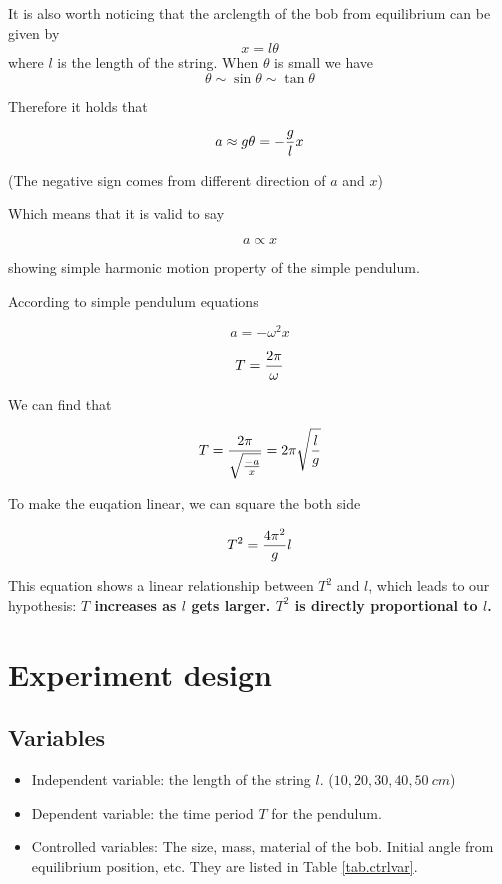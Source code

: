 \documentclass[a4paper]{article}
\begin{document}
It is also worth noticing that the arclength of the bob from equilibrium can be given by $$x = l\theta$$ where $l$ is the length of the string. When $\theta$ is small we have $$\theta \sim \sin \theta \sim \tan \theta$$

Therefore it holds that

$$a \approx g\theta = -{g\over l} x $$

(The negative sign comes from different direction of $a$ and $x$)

Which means that it is valid to say

$$a \propto x$$

showing simple harmonic motion property of the simple pendulum.

According to simple pendulum equations 

$$a = -\omega^2 x$$

$$T = {2\pi \over \omega}$$

We can find that 

$$T = {2\pi\over \sqrt{-a\over x}} = 2\pi\sqrt{l\over g}$$

To make the euqation linear, we can square the both side

$$T^2 = {4\pi^2\over g}l$$

This equation shows a linear relationship between $T^2$ and $l$, which leads to our hypothesis: \textbf{$T$ increases as $l$ gets larger. $T^2$ is directly proportional to $l$.}

\section{Experiment design}

\subsection{Variables}

\begin{itemize}
    \item Independent variable: the length of the string $l$. ($10, 20, 30, 40, 50 \SI{}{cm}$)
    \item Dependent variable: the time period $T$ for the pendulum.
    \item Controlled variables: The size, mass, material of the bob. Initial angle from equilibrium position, etc. They are listed in Table \ref{tab.ctrlvar}.
\end{itemize}
\end{document}
